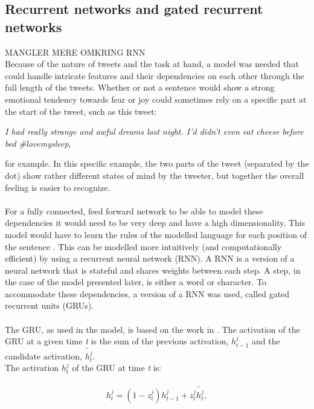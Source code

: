 \subsection{Recurrent networks and gated recurrent networks}
MANGLER MERE OMKRING RNN\\
Because of the nature of tweets and the task at hand, a model was needed that could handle intricate features and their dependencies on each other through the full length of the tweets. Whether or not a sentence would show a strong emotional tendency towards fear or joy could sometimes rely on a specific part at the start of the tweet, such as this tweet:\\
\begin{center}
\textit{I had really strange and awful dreams last night. I'd didn't even eat cheese before bed  \#lovemysleep},\\
\end{center}
for example. In this specific example, the two parts of the tweet (separated by the dot) show rather different states of mind by the tweeter, but together the overall feeling is easier to recognize.\\
\\
For a fully connected, feed forward network to be able to model these dependencies it would need to be very deep and have a high dimensionality. This model would have to learn the rules of the modelled language for each position of the sentence \cite{deeplearning}. This can be modelled more intuitively (and computationally efficient) by using a recurrent neural network (RNN). A RNN is a version of a neural network that is stateful and shares weights between each step. A step, in the case of the model presented later, is either a word or character. To accommodate these dependencies, a version of a RNN was used, called gated recurrent units (GRUs).\\
\\
The GRU, as used in the model, is based on the work in \cite{chung}. The activation of the GRU at a given time \textit{t} is the sum of the previous activation, $h_{t-1}^{j}$ and the candidate activation, $\tilde{h_{t}^{j}}$.\\
The activation $h_{t}^{j}$ of the GRU at time \textit{t} is:\\
\\
\begin{equation} \label{eq:activation}
h_{t}^{j} = \left(1 - z_{t}^{j}\right)h_{t-1}^{j}+z_{t}^{j}\tilde{h_{t}^{j}},
\end{equation}\\


